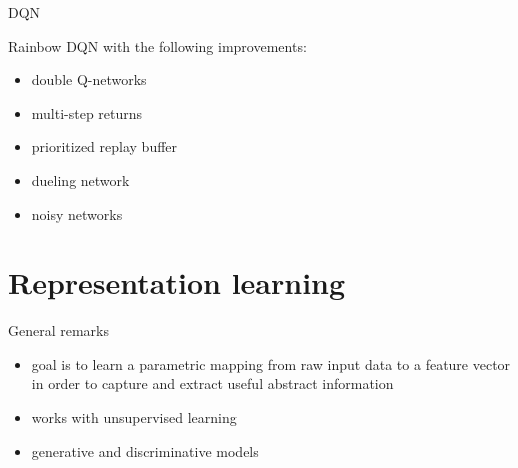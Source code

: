 \documentclass{beamer}
\begin{document}
\begin{frame}{DQN}
		
\end{frame}

\begin{frame}{Rainbow}
DQN with the following improvements:
\begin{itemize}
		\item double Q-networks 
		\item multi-step returns
		\item prioritized replay buffer
		\item dueling network
		\item noisy networks
\end{itemize}
\end{frame}


\section{Representation learning} 

\begin{frame}{General remarks}
		\begin{itemize}
				\item goal is to learn a parametric mapping from raw input data
						to a feature vector in order to capture and extract useful
						abstract information
				\item works with unsupervised learning 
				\item generative and discriminative models
		\end{itemize}
\end{frame}
\end{document}
